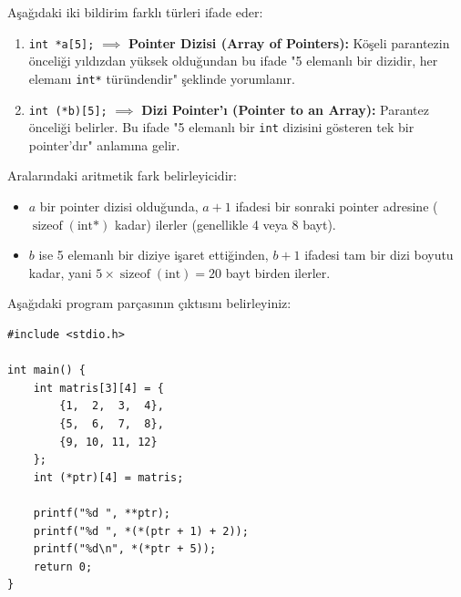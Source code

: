\begin{definition}
Aşağıdaki iki bildirim farklı türleri ifade eder:
\begin{enumerate}
    \item \texttt{int *a[5];} $\implies$ \textbf{Pointer Dizisi (Array of Pointers):} 
    Köşeli parantezin önceliği yıldızdan yüksek olduğundan bu ifade "5 elemanlı bir dizidir, her elemanı \texttt{int*} türündendir" şeklinde yorumlanır.
    \item \texttt{int (*b)[5];} $\implies$ \textbf{Dizi Pointer'ı (Pointer to an Array):} 
    Parantez önceliği belirler. Bu ifade "5 elemanlı bir \texttt{int} dizisini gösteren tek bir pointer'dır" anlamına gelir.
\end{enumerate}
\end{definition}

Aralarındaki aritmetik fark belirleyicidir:
\begin{itemize}
    \item $a$ bir pointer dizisi olduğunda, $a + 1$ ifadesi bir sonraki pointer adresine ($\operatorname{sizeof}(\text{int*})$ kadar) ilerler (genellikle 4 veya 8 bayt).
    \item $b$ ise 5 elemanlı bir diziye işaret ettiğinden, $b + 1$ ifadesi tam bir dizi boyutu kadar, yani $5 \times \operatorname{sizeof}(\text{int}) = 20$ bayt birden ilerler.
\end{itemize}

\begin{example}
Aşağıdaki program parçasının çıktısını belirleyiniz:
\begin{lstlisting}[language=CTemel]
#include <stdio.h>

int main() {
    int matris[3][4] = {
        {1,  2,  3,  4},
        {5,  6,  7,  8},
        {9, 10, 11, 12}
    };
    int (*ptr)[4] = matris;

    printf("%d ", **ptr);
    printf("%d ", *(*(ptr + 1) + 2));
    printf("%d\n", *(*ptr + 5));
    return 0;
}
\end{lstlisting}
\end{example}


